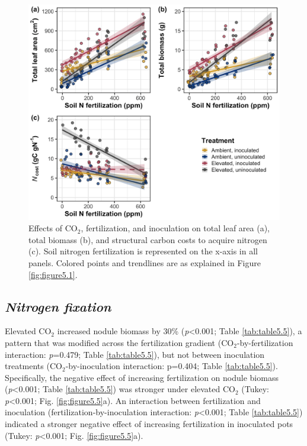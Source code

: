 \newpage
\begin{figure}
    \centering
    \includegraphics[width=\columnwidth]{ch5_NxCO2xI/figs/NxCO2xI_fig4_wholePlant.jpg}
    \caption[Effects of CO$_2$, fertilization, and inoculation on total leaf area, total biomass, and structural carbon costs to acquire nitrogen]{Effects of CO$_2$, fertilization, and inoculation on total leaf area (a), total biomass (b), and structural carbon costs to acquire nitrogen (c). Soil nitrogen fertilization is represented on the x-axis in all panels. Colored points and trendlines are as explained in Figure \ref{fig:figure5.1}.}
    \label{fig:figure5.4}
\end{figure}
\clearpage

\subsection{\textit{Nitrogen fixation}}
\noindent Elevated CO$_2$ increased nodule biomass by 30\% (\textit{p}<0.001; Table \ref{tab:table5.5}), a pattern that was modified across the fertilization gradient (CO$_2$-by-fertilization interaction: \textit{p}=0.479; Table \ref{tab:table5.5}), but not between inoculation treatments (CO$_2$-by-inoculation interaction: p=0.404; Table \ref{tab:table5.5}). Specifically, the negative effect of increasing fertilization on nodule biomass (\textit{p}<0.001; Table \ref{tab:table5.5}) was stronger under elevated CO$_2$ (Tukey: \textit{p}<0.001; Fig. \ref{fig:figure5.5}a). An interaction between fertilization and inoculation (fertilization-by-inoculation interaction: \textit{p}<0.001; Table \ref{tab:table5.5}) indicated a stronger negative effect of increasing fertilization in inoculated pots (Tukey: \textit{p}<0.001; Fig. \ref{fig:figure5.5}a).

